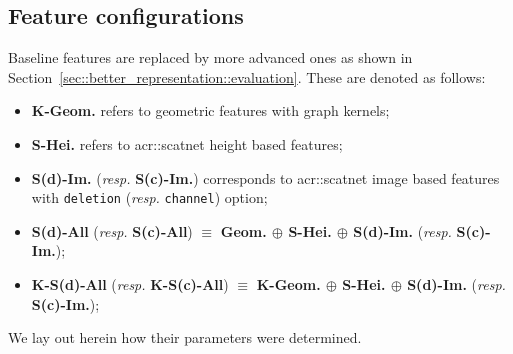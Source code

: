     \subsection{Feature configurations}
        \label{subsec::better_representation::implementation::features}
        Baseline features are replaced by more advanced ones as shown in Section~\ref{sec::better_representation::evaluation}.
        These are denoted as follows:
        \begin{itemize}[label=\(\blacktriangleright\)]
            \item \textbf{K-Geom.} refers to geometric features with graph kernels;
            \item \textbf{S-Hei.} refers to \gls{acr::scatnet} height based features;
            \item \textbf{S(d)-Im.} (\textit{resp.} \textbf{S(c)-Im.}) corresponds to \gls{acr::scatnet} image based features with \texttt{deletion} (\textit{resp.} \texttt{channel}) option;
            \item \textbf{S(d)-All} (\textit{resp.} \textbf{S(c)-All}) \(\equiv\) \textbf{Geom. \(\oplus\) S-Hei. \(\oplus\) S(d)-Im.} (\textit{resp.} \textbf{S(c)-Im.});
            \item \textbf{K-S(d)-All} (\textit{resp.} \textbf{K-S(c)-All}) \(\equiv\) \textbf{K-Geom. \(\oplus\) S-Hei. \(\oplus\) S(d)-Im.} (\textit{resp.} \textbf{S(c)-Im.});
        \end{itemize}
        We lay out herein how their parameters were determined.
        
